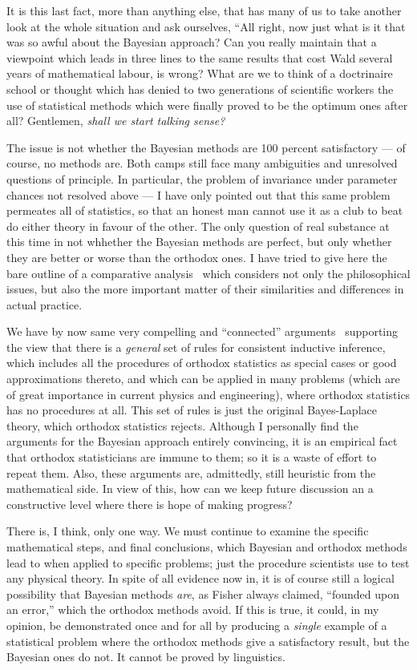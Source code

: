 \documentclass[12pt]{article}
\let\oldcite\cite
\renewcommand{\cite}{~\oldcite}
\begin{document}
It is this last fact, more than anything else, that has many of us to take another look at the whole situation and ask ourselves, ``All right, now just what is it that was so awful about the Bayesian approach? Can you really maintain that a viewpoint which leads in three lines to the same results that cost Wald several years of mathematical labour, is wrong? What are we to think of a doctrinaire school or thought which has denied to two generations of scientific workers the use of statistical methods which were finally proved to be the optimum ones after all? Gentlemen, \emph{shall we start talking sense?}

The issue is not whether the Bayesian methods are 100 percent satisfactory --- of course, no methods are. Both camps still face many ambiguities and unresolved questions of principle. In particular,  the problem of invariance under parameter chances
not resolved above --- I have only pointed out that this same problem permeates all of statistics, so that an honest man cannot use it as a club to beat do either theory in favour of the other. The only question of real substance at this time in not whhether the Bayesian methods are perfect, but only whether they are better or worse than the orthodox ones. I have tried to give here the bare outline of a comparative analysis\cite{jaynes} which considers not only the philosophical issues, but also the more important matter of their similarities and differences in actual practice.

We have by now same very compelling and ``connected'' arguments\cite{jaynes,cox,coxjaynes} supporting the view that there is a \emph{general} set of rules for consistent inductive inference, which includes all the procedures of orthodox statistics as special cases or good approximations thereto, and which can be applied in many problems (which are of great importance in current physics and engineering), where orthodox statistics has no procedures at all. This set of rules is just the original Bayes-Laplace theory, which orthodox statistics rejects. Although I personally find the arguments for the Bayesian approach entirely convincing, it is an empirical fact that orthodox statisticians are immune to them; so it is a waste of effort to repeat them. Also, these arguments are, admittedly, still heuristic from the mathematical side. In view of this, how can we keep future discussion an a constructive level where there is hope of making progress?

There is, I think, only one way. We must continue to examine the specific mathematical steps, and final conclusions, which Bayesian and orthodox methods lead to when applied to specific problems; just the procedure scientists use to test any physical theory. In spite of all evidence now in, it is of course still a logical possibility that Bayesian methods \emph{are}, as Fisher always claimed, ``founded upon an error,'' which the orthodox methods avoid. If this is true, it could, in my opinion, be demonstrated once and for all by producing a \emph{single} example of a statistical problem where the orthodox methods give a satisfactory result, but the Bayesian ones do not. It cannot be proved by linguistics.
\end{document}
